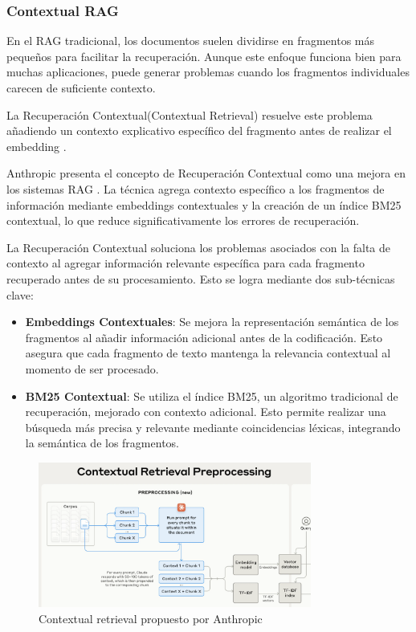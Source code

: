 \subsubsection{Contextual RAG}

En el RAG tradicional, los documentos suelen dividirse en fragmentos más pequeños para facilitar la recuperación. 
Aunque este enfoque funciona bien para muchas aplicaciones, puede generar problemas cuando los fragmentos individuales carecen de suficiente contexto.

La Recuperación Contextual(Contextual Retrieval) resuelve este problema añadiendo un contexto explicativo específico del fragmento antes de realizar el embedding \cite{veturi2024ragbasedquestionansweringcontextual}.


Anthropic presenta el concepto de Recuperación Contextual como una mejora en los sistemas RAG \cite{Anthropic2024}. 
La técnica agrega contexto específico a los fragmentos de información mediante embeddings contextuales y la creación de un índice BM25 contextual, lo que reduce significativamente los errores de recuperación.

La Recuperación Contextual soluciona los problemas asociados con la falta de contexto al agregar información relevante específica para cada fragmento recuperado antes de su procesamiento. Esto se logra mediante dos sub-técnicas clave:

\begin{itemize}
    \item \textbf{Embeddings Contextuales}: Se mejora la representación semántica de los fragmentos al añadir información adicional antes de la codificación. Esto asegura que cada fragmento de texto mantenga la relevancia contextual al momento de ser procesado.
    \item \textbf{BM25 Contextual}: Se utiliza el índice BM25, un algoritmo tradicional de recuperación, mejorado con contexto adicional. Esto permite realizar una búsqueda más precisa y relevante mediante coincidencias léxicas, integrando la semántica de los fragmentos.
\end{itemize}


\begin{figure}[h]
	\centering
	\includegraphics[width=0.8\textwidth]{figs/contextual_retrieval.png}
	\caption{Contextual retrieval propuesto por Anthropic}
	\label{fig:context-anoni1}
\end{figure}



